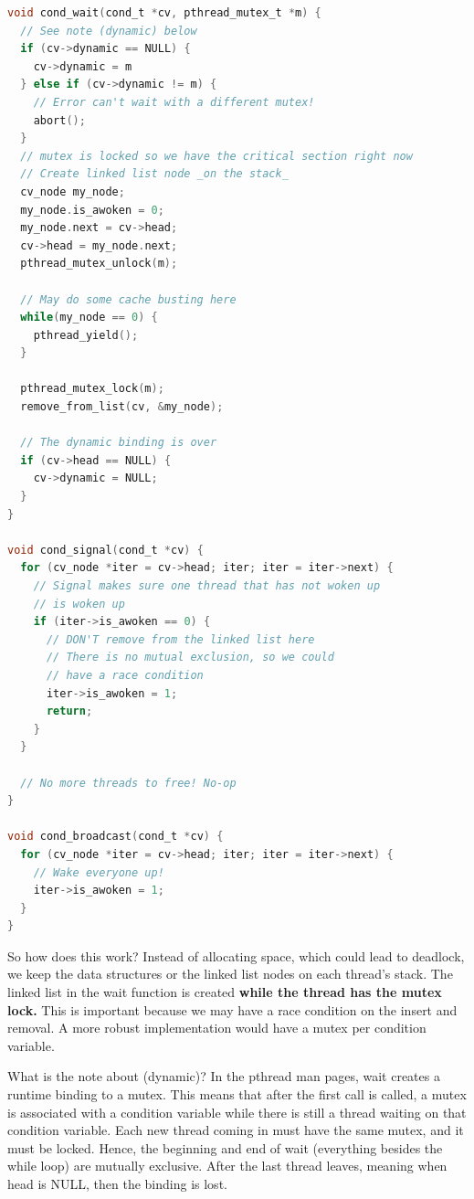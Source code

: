 \begin{lstlisting}[language=C]
void cond_wait(cond_t *cv, pthread_mutex_t *m) {
  // See note (dynamic) below
  if (cv->dynamic == NULL) {
    cv->dynamic = m
  } else if (cv->dynamic != m) {
    // Error can't wait with a different mutex!
    abort();
  }
  // mutex is locked so we have the critical section right now
  // Create linked list node _on the stack_
  cv_node my_node;
  my_node.is_awoken = 0;
  my_node.next = cv->head;
  cv->head = my_node.next;
  pthread_mutex_unlock(m);

  // May do some cache busting here
  while(my_node == 0) {
    pthread_yield();
  }

  pthread_mutex_lock(m);
  remove_from_list(cv, &my_node);

  // The dynamic binding is over
  if (cv->head == NULL) {
    cv->dynamic = NULL;
  }
}

void cond_signal(cond_t *cv) {
  for (cv_node *iter = cv->head; iter; iter = iter->next) {
    // Signal makes sure one thread that has not woken up
    // is woken up
    if (iter->is_awoken == 0) {
      // DON'T remove from the linked list here
      // There is no mutual exclusion, so we could
      // have a race condition
      iter->is_awoken = 1;
      return;
    }
  }

  // No more threads to free! No-op
}

void cond_broadcast(cond_t *cv) {
  for (cv_node *iter = cv->head; iter; iter = iter->next) {
    // Wake everyone up!
    iter->is_awoken = 1;
  }
}
\end{lstlisting}

So how does this work?
Instead of allocating space, which could lead to deadlock,
we keep the data structures or the linked list nodes on each thread's stack.
The linked list in the wait function is created \textbf{while the thread has the mutex lock.} This is important because we may have a race condition on the insert and removal.
A more robust implementation would have a mutex per condition variable.

What is the note about (dynamic)?
In the pthread man pages, wait creates a runtime binding to a mutex. This means that after the first call is called, a mutex is associated with a condition variable while there is still a thread waiting on that condition variable.
Each new thread coming in must have the same mutex, and it must be locked.
Hence, the beginning and end of wait (everything besides the while loop) are mutually exclusive.
After the last thread leaves, meaning when head is NULL, then the binding is lost.

